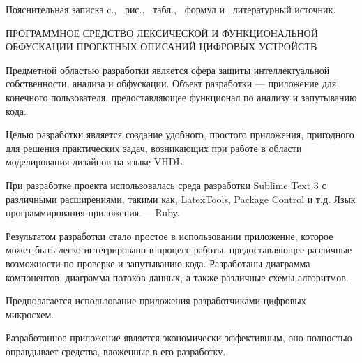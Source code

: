 \thispagestyle{empty}


Пояснительная записка \pageref*{LastPage}c., \totfig{}~рис., \tottab{}~табл., \toteq{}~формул и \totref{}~литературный источник.

ПРОГРАММНОЕ СРЕДСТВО ЛЕКСИЧЕСКОЙ И ФУНКЦИОНАЛЬНОЙ ОБФУСКАЦИИ ПРОЕКТНЫХ ОПИСАНИЙ ЦИФРОВЫХ УСТРОЙСТВ

Предметной областью разработки является сфера защиты интеллектуальной собственности, анализа и обфускации. Объект разработки --- приложение для конечного пользователя, предоставляющее функционал по анализу и запутыванию кода.

Целью разработки является создание удобного, простого приложения, пригодного для решения практических задач, возникающих при работе в области моделирования дизайнов на языке VHDL.

При разработке проекта использовалась среда разработки Sublime Text 3 с различными расширениями, такими как, LatexTools, Package Control и т.д. Язык программирования приложения --- Ruby.


Результатом разработки стало простое в использовании приложение, которое может быть легко интегрировано в процесс работы, предоставляющее различные возможности по проверке и запутыванию кода. Разработаны диаграмма компонентов, диаграмма потоков данных, а также различные схемы алгоритмов.

Предполагается использование приложения разработчиками цифровых микросхем.

Разработанное приложение является экономически эффективным, оно полностью  оправдывает средства, вложенные в его разработку.



